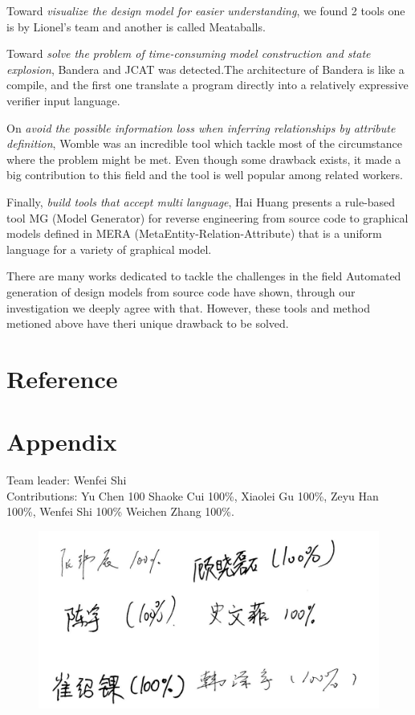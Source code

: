 \documentclass[acmsmall]{acmart}
\begin{document}
Toward {\itshape visualize the design model for easier understanding}, we found 2 tools one is by Lionel's team and another is called Meataballs.


Toward {\itshape solve the problem of time-consuming model construction and state explosion}, Bandera and JCAT was detected.The architecture of Bandera is like a compile, and
 the first one  translate a program directly into a relatively expressive verifier input language.


 On {\itshape avoid the possible information loss when inferring relationships by attribute
 definition}, Womble was an incredible tool which tackle most of the circumstance where the problem might be met.
 Even though some drawback exists, it made a big contribution to this field and the tool is 
 well popular among related workers.


Finally, {\itshape build tools that accept multi language}, Hai Huang presents a rule-based tool MG (Model Generator) for reverse engineering from
source code to graphical models defined in MERA (MetaEntity-Relation-Attribute) that is a uniform language for a variety of graphical model.


There are many works dedicated to tackle the challenges in the field Automated generation of design models from source code have shown, through our investigation we deeply agree with that.
However, these tools and method metioned above have theri unique drawback to be solved.





\section{Reference}



\section{Appendix}
Team leader: Wenfei Shi\\
Contributions: Yu Chen 100%
Shaoke Cui 100\%,
Xiaolei Gu 100\%,
Zeyu Han 100\%,
Wenfei Shi 100\%
Weichen Zhang 100\%.
\begin{figure}[h]
  \centerline{\includegraphics[scale=0.2]{signature.jpg}}
\end{figure}
\end{document}
